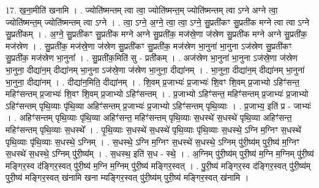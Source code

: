 \documentclass[17pt]{extarticle}
\begin{document}
17. ख॒ना॒मीति॑ खनामि । . ज्योति॑ष्मन्तम् त्वा त्वा॒ ज्योति॑ष्मन्त॒म् ज्योति॑ष्मन्तम् त्वा ऽग्ने अग्ने त्वा॒ ज्योति॑ष्मन्त॒म् ज्योति॑ष्मन्तम् त्वा ऽग्ने । . त्वा॒ ऽग्ने॒ अ॒ग्ने॒ त्वा॒ त्वा॒ ऽग्ने॒ सु॒प्रती॑कꣳ सु॒प्रती॑क मग्ने त्वा त्वा ऽग्ने सु॒प्रती॑कम् । . अ॒ग्ने॒ सु॒प्रती॑कꣳ सु॒प्रती॑क मग्ने अग्ने सु॒प्रती॑क॒ मज॑स्रे॒णा ज॑स्रेण सु॒प्रती॑क मग्ने अग्ने सु॒प्रती॑क॒ मज॑स्रेण । . सु॒प्रती॑क॒ मज॑स्रे॒णा ज॑स्रेण सु॒प्रती॑कꣳ सु॒प्रती॑क॒ मज॑स्रेण भा॒नुना॑ भा॒नुना ऽज॑स्रेण सु॒प्रती॑कꣳ सु॒प्रती॑क॒ मज॑स्रेण भा॒नुना᳚ । . सु॒प्रती॑क॒मिति॑ सु - प्रती॑कम् । . अज॑स्रेण भा॒नुना॑ भा॒नुना ऽज॑स्रे॒णा ज॑स्रेण भा॒नुना॒ दीद्या॑न॒म् दीद्या॑नम् भा॒नुना ऽज॑स्रे॒णा ज॑स्रेण भा॒नुना॒ दीद्या॑नम् । . भा॒नुना॒ दीद्या॑न॒म् दीद्या॑नम् भा॒नुना॑ भा॒नुना॒ दीद्या॑नम् । . दीद्या॑न॒मिति॒ दीद्या॑नम् । . शि॒वम् प्र॒जाभ्यः॑ प्र॒जाभ्यः॑ शि॒वꣳ शि॒वम् प्र॒जाभ्यो ऽहिꣳ॑सन्त॒ महिꣳ॑सन्तम् प्र॒जाभ्यः॑ शि॒वꣳ शि॒वम् प्र॒जाभ्यो ऽहिꣳ॑सन्तम् । . प्र॒जाभ्यो ऽहिꣳ॑सन्त॒ महिꣳ॑सन्तम् प्र॒जाभ्यः॑ प्र॒जाभ्यो ऽहिꣳ॑सन्तम् पृथि॒व्याः पृ॑थि॒व्या अहिꣳ॑सन्तम् प्र॒जाभ्यः॑ प्र॒जाभ्यो ऽहिꣳ॑सन्तम् पृथि॒व्याः । . प्र॒जाभ्य॒ इति॑ प्र - जाभ्यः॑ । . अहिꣳ॑सन्तम् पृथि॒व्याः पृ॑थि॒व्या अहिꣳ॑सन्त॒ महिꣳ॑सन्तम् पृथि॒व्याः स॒धस्थे॑ स॒धस्थे॑ पृथि॒व्या अहिꣳ॑सन्त॒ महिꣳ॑सन्तम् पृथि॒व्याः स॒धस्थे᳚ । . पृ॒थि॒व्याः स॒धस्थे॑ स॒धस्थे॑ पृथि॒व्याः पृ॑थि॒व्याः स॒धस्थे॒ ऽग्नि म॒ग्निꣳ स॒धस्थे॑ पृथि॒व्याः पृ॑थि॒व्याः स॒धस्थे॒ ऽग्निम् । . स॒धस्थे॒ ऽग्नि म॒ग्निꣳ स॒धस्थे॑ स॒धस्थे॒ ऽग्निम् पु॑री॒ष्य॑म् पुरी॒ष्य॑ म॒ग्निꣳ स॒धस्थे॑ स॒धस्थे॒ ऽग्निम् पु॑री॒ष्य᳚म् । . स॒धस्थ॒ इति॑ स॒ध - स्थे॒ । . अ॒ग्निम् पु॑री॒ष्य॑म् पुरी॒ष्य॑ म॒ग्नि म॒ग्निम् पु॑री॒ष्य॑ मङ्गिर॒स्व द॑ङ्गिर॒स्वत् पु॑री॒ष्य॑ म॒ग्नि म॒ग्निम् पु॑री॒ष्य॑ मङ्गिर॒स्वत् । . पु॒री॒ष्य॑ मङ्गिर॒स्व द॑ङ्गिर॒स्वत् पु॑री॒ष्य॑म् पुरी॒ष्य॑ मङ्गिर॒स्वत् ख॑नामि खना म्यङ्गिर॒स्वत् पु॑री॒ष्य॑म् पुरी॒ष्य॑ मङ्गिर॒स्वत् ख॑नामि । \newline
\end{document}
